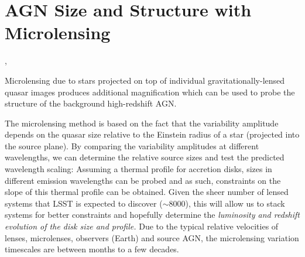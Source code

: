 


%
%
%

\section{AGN Size and Structure with Microlensing}\label{sec:AGNMicrolensing}
\def\secname{\chpname:microlensing}\label{sec:\secname}

,

Microlensing due to stars projected on top of individual
gravitationally-lensed quasar images produces additional magnification which can be used to probe the structure of the background high-redshift AGN.

The microlensing method is based on the fact that the variability amplitude depends on the quasar size relative to the Einstein radius of a star (projected into the source plane). By comparing the variability amplitudes at different wavelengths, we can determine the relative source sizes and test the predicted wavelength scaling: Assuming a thermal profile for accretion disks, sizes in different emission
wavelengths can be probed and as such, constraints on the slope of this
thermal profile can be obtained. Given the sheer number of lensed systems that LSST is expected to discover ($\sim8000$), this will allow us to stack systems for better
constraints and hopefully determine the {\it luminosity and redshift evolution
of the disk size and profile.} Due to the typical relative velocities of lenses,
microlenses, observers (Earth) and source AGN, the microlensing variation
timescales are between months to a few decades.





